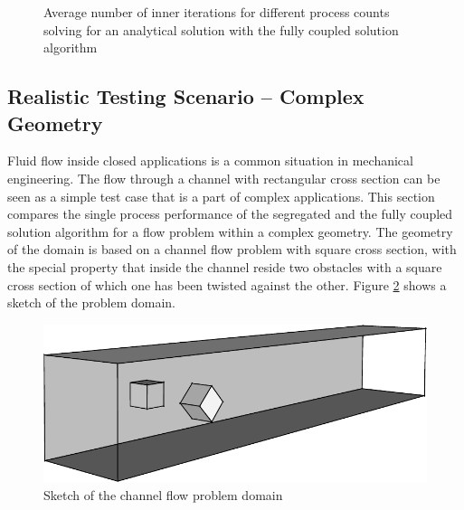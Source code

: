 \begin{figure}[h!]
  \begin{center}
  \end{center}
  \caption{Average number of inner iterations for different process counts solving for an analytical solution with the fully coupled solution algorithm}
  \label{fig:weakinner}
\end{figure}

\subsection{Realistic Testing Scenario -- Complex Geometry}
\label{sec:channel}

Fluid flow inside closed applications is a common situation in mechanical engineering. The flow through a channel with rectangular cross section can be seen as a simple test case that is a part of complex applications. This section compares the single process performance of the segregated and the fully coupled solution algorithm for a flow problem within a complex geometry. The geometry of the domain is based on a channel flow problem with square cross section, with the special property that inside the channel reside two obstacles with a square cross section of which one has been twisted against the other. Figure \ref{fig:sketch} shows a sketch of the problem domain. 

\begin{figure}
  \centering
  \includegraphics{./img/channel3d.pdf}
  \caption{Sketch of the channel flow problem domain}
  \label{fig:sketch}
\end{figure}

